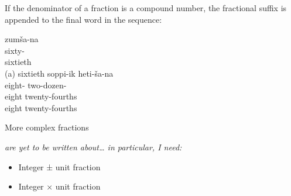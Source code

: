 \documentclass[grammar]{subfiles}
\begin{document}
  If the denominator of a fraction is a compound number, the fractional suffix is appended to the final word in the sequence:

  \begin{exe}
    \ex
    \begin{xlist}
      \ex {}
      \glll zumša-na\\
      sixty-{\Frac}\\
      sixtieth\\
      \glt (a) sixtieth
      \ex {}
      \glll soppi-ik heti-ša-na\\
      eight-{\Ord} two-dozen-{\Frac}\\
      eight twenty-fourths\\
      \glt eight twenty-fourths
    \end{xlist}
  \end{exe}


  More complex fractions {\em are yet to be written about… in particular, I need:
    \begin{itemize}
      \item Integer ± unit fraction
      \item Integer × unit fraction
    \end{itemize}
  }
\end{document}
